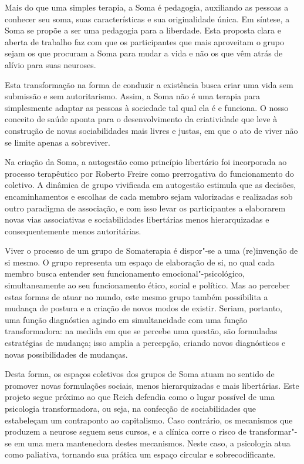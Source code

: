 Mais do que uma simples terapia, a Soma é pedagogia, auxiliando as
pessoas a conhecer seu soma, suas características e sua originalidade
única. Em síntese, a Soma se propõe a ser uma pedagogia para a
liberdade. Esta proposta clara e aberta de trabalho faz com que os
participantes que mais aproveitam o grupo sejam os que procuram a Soma
para mudar a vida e não os que vêm atrás de alívio para suas neuroses.

Esta transformação na forma de conduzir a existência busca criar uma
vida sem submissão e sem autoritarismo. Assim, a Soma não é uma terapia
para simplesmente adaptar as pessoas à sociedade tal qual ela é e
funciona. O nosso conceito de saúde aponta para o desenvolvimento da
criatividade que leve à construção de novas sociabilidades mais livres e
justas, em que o ato de viver não se limite apenas a sobreviver.

Na criação da Soma, a autogestão como princípio libertário foi
incorporada ao processo terapêutico por Roberto Freire como prerrogativa
do funcionamento do coletivo. A dinâmica de grupo vivificada em
autogestão estimula que as decisões, encaminhamentos e escolhas de cada
membro sejam valorizadas e realizadas sob outro paradigma de associação,
e com isso levar os participantes a elaborarem novas vias associativas e
sociabilidades libertárias menos hierarquizadas e consequentemente menos
autoritárias.

Viver o processo de um grupo de Somaterapia é dispor"-se a uma
(re)invenção de si mesmo. O grupo representa um espaço de elaboração de
si, no qual cada membro busca entender seu funcionamento
emocional"-psicológico, simultaneamente ao seu funcionamento ético,
social e político. Mas ao perceber estas formas de atuar no mundo, este
mesmo grupo também possibilita a mudança de postura e a criação de novos
modos de existir. Seriam, portanto, uma função diagnóstica agindo em
simultaneidade com uma função transformadora: na medida em que se
percebe uma questão, são formuladas estratégias de mudança; isso amplia
a percepção, criando novos diagnósticos e novas possibilidades de
mudanças.

Desta forma, os espaços coletivos dos grupos de Soma atuam no sentido de
promover novas formulações sociais, menos hierarquizadas e mais
libertárias. Este projeto segue próximo ao que Reich defendia como o
lugar possível de uma psicologia transformadora, ou seja, na confecção
de sociabilidades que estabeleçam um contraponto ao capitalismo. Caso
contrário, os mecanismos que produzem a neurose seguem seus cursos, e a
clínica corre o risco de transformar"-se em uma mera mantenedora destes
mecanismos. Neste caso, a psicologia atua como paliativa, tornando sua
prática um espaço circular e sobrecodificante.

